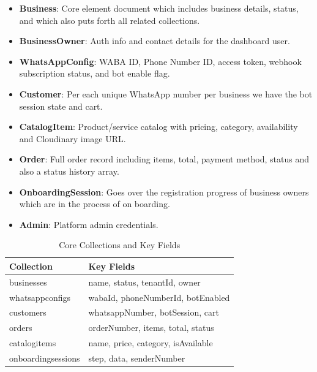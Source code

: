 \begin{itemize}

    \item \textbf{Business}: Core element document which includes business details, status, and which also puts forth all related collections.
    
    \item \textbf{BusinessOwner}: Auth info and contact details for the dashboard user.
    
    \item \textbf{WhatsAppConfig}: WABA ID, Phone Number ID, access token, webhook subscription status, and bot enable flag.
    
    \item \textbf{Customer}: Per each unique WhatsApp number per business we have the bot session state and cart.
    
    \item \textbf{CatalogItem}: Product/service catalog with pricing, category, availability and Cloudinary image URL.
    
    \item \textbf{Order}: Full order record including items, total, payment method, status and also a status history array.
    
    \item \textbf{OnboardingSession}: Goes over the registration progress of business owners which are in the process of on boarding.
    
    \item \textbf{Admin}: Platform admin credentials.

\end{itemize}

\begin{table}[H]
\centering
\caption{Core Collections and Key Fields}
\renewcommand{\arraystretch}{1.3}
\begin{tabularx}{\textwidth}{|l|X|}
\hline
\textbf{Collection} & \textbf{Key Fields} \\
\hline
businesses & name, status, tenantId, owner \\
\hline
whatsappconfigs & wabaId, phoneNumberId, botEnabled \\
\hline
customers & whatsappNumber, botSession, cart \\
\hline
orders & orderNumber, items, total, status \\
\hline
catalogitems & name, price, category, isAvailable \\
\hline
onboardingsessions & step, data, senderNumber \\
\hline
\end{tabularx}
\end{table}

